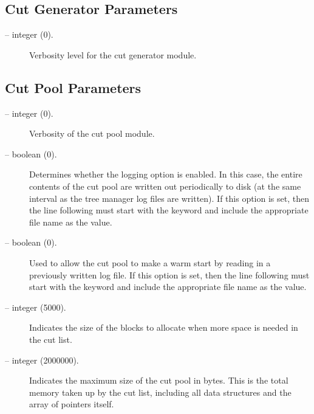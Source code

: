 \subsection{Cut Generator Parameters}

\begin{description}

\item[ -- integer (0).] 
Verbosity level for the cut generator module.

\end{description}

\subsection{Cut Pool Parameters}
\label{cut_pool_params}
\begin{description}

\item[ -- integer (0).] 
Verbosity of the cut pool module.

\item[ -- boolean (0).] 
Determines whether the logging option is enabled. In this case, the
entire contents of the cut pool are written out periodically to disk
(at the same interval as the tree manager log files are written). If
this option is set, then the line following must start with the
keyword  and include the appropriate
file name as the value.

\item[ -- boolean (0).] 
Used to allow the cut pool to make a warm start by reading in a
previously written log file. If
this option is set, then the line following must start with the
keyword  and include the appropriate
file name as the value.

\item[ -- integer (5000).] 
Indicates the size of the blocks to allocate when more space is needed
in the cut list.

\item[ -- integer (2000000).] 
Indicates the maximum size of the cut pool in bytes. This is the total
memory taken up by the cut list, including all data structures and the
array of pointers itself.


\end{description}
